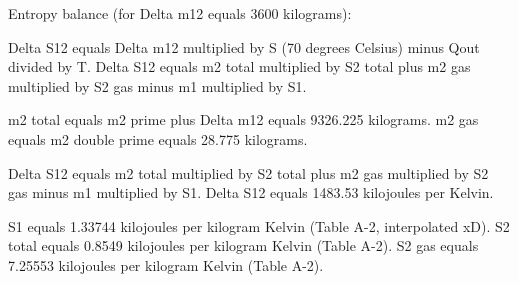 Entropy balance (for Delta m12 equals 3600 kilograms):  

Delta S12 equals Delta m12 multiplied by S (70 degrees Celsius) minus Qout divided by T.  
Delta S12 equals m2 total multiplied by S2 total plus m2 gas multiplied by S2 gas minus m1 multiplied by S1.  

m2 total equals m2 prime plus Delta m12 equals 9326.225 kilograms.  
m2 gas equals m2 double prime equals 28.775 kilograms.  

Delta S12 equals m2 total multiplied by S2 total plus m2 gas multiplied by S2 gas minus m1 multiplied by S1.  
Delta S12 equals 1483.53 kilojoules per Kelvin.  

S1 equals 1.33744 kilojoules per kilogram Kelvin (Table A-2, interpolated xD).  
S2 total equals 0.8549 kilojoules per kilogram Kelvin (Table A-2).  
S2 gas equals 7.25553 kilojoules per kilogram Kelvin (Table A-2).